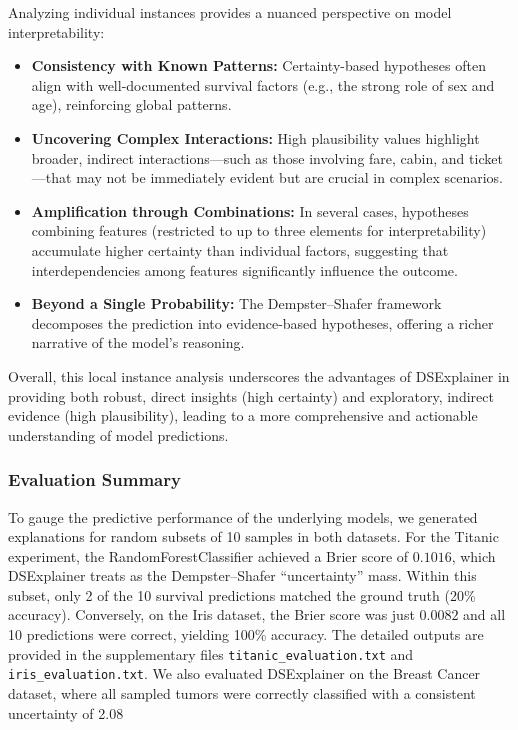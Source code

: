 \documentclass[acmlarge]{acmart}
\begin{document}
Analyzing individual instances provides a nuanced perspective on model interpretability:
\begin{itemize}
    \item \textbf{Consistency with Known Patterns:} Certainty-based hypotheses often align with well-documented survival factors (e.g., the strong role of sex and age), reinforcing global patterns.
    \item \textbf{Uncovering Complex Interactions:} High plausibility values highlight broader, indirect interactions—such as those involving fare, cabin, and ticket—that may not be immediately evident but are crucial in complex scenarios.
    \item \textbf{Amplification through Combinations:} In several cases, hypotheses combining features (restricted to up to three elements for interpretability) accumulate higher certainty than individual factors, suggesting that interdependencies among features significantly influence the outcome.
    \item \textbf{Beyond a Single Probability:} The Dempster–Shafer framework decomposes the prediction into evidence-based hypotheses, offering a richer narrative of the model’s reasoning.
\end{itemize}

Overall, this local instance analysis underscores the advantages of DSExplainer in providing both robust, direct insights (high certainty) and exploratory, indirect evidence (high plausibility), leading to a more comprehensive and actionable understanding of model predictions.
\subsubsection{Evaluation Summary}
\label{sec:validation}

To gauge the predictive performance of the underlying models, we generated explanations for random subsets of 10 samples in both datasets. For the Titanic experiment, the RandomForestClassifier achieved a Brier score of $0.1016$, which DSExplainer treats as the Dempster--Shafer ``uncertainty'' mass. Within this subset, only 2 of the 10 survival predictions matched the ground truth (20\% accuracy). Conversely, on the Iris dataset, the Brier score was just $0.0082$ and all 10 predictions were correct, yielding 100\% accuracy. The detailed outputs are provided in the supplementary files \texttt{titanic\_evaluation.txt} and \texttt{iris\_evaluation.txt}.
We also evaluated DSExplainer on the Breast Cancer dataset, where all sampled tumors were correctly classified with a consistent uncertainty of 2.08%
\end{document}
